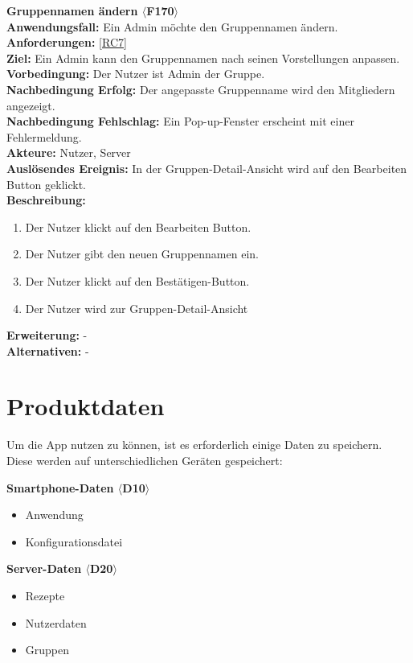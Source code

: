 \documentclass[parskip=full]{scrartcl}
\begin{document}
\textbf{Gruppennamen ändern $\langle$F170$\rangle$}\\
\textbf{Anwendungsfall:} Ein Admin möchte den Gruppennamen ändern.\\
\textbf{Anforderungen:} \ref{RC7}\\
\textbf{Ziel:} Ein Admin kann den Gruppennamen nach seinen Vorstellungen anpassen.\\
\textbf{Vorbedingung:} Der Nutzer ist Admin der Gruppe.\\
\textbf{Nachbedingung Erfolg:} Der angepasste Gruppenname wird den Mitgliedern angezeigt.\\
\textbf{Nachbedingung Fehlschlag:} Ein Pop-up-Fenster erscheint mit einer Fehlermeldung.\\
\textbf{Akteure:} Nutzer, Server \\
\textbf{Auslösendes Ereignis:} In der Gruppen-Detail-Ansicht wird auf den Bearbeiten Button geklickt.\\
\textbf{Beschreibung:}
\begin{enumerate}
    \item Der Nutzer klickt auf den Bearbeiten Button.
    \item Der Nutzer gibt den neuen Gruppennamen ein.
    \item Der Nutzer klickt auf den Bestätigen-Button.
    \item Der Nutzer wird zur Gruppen-Detail-Ansicht
\end{enumerate}
\textbf{Erweiterung:} -\\
\textbf{Alternativen:} -\\
\newpage

\section{Produktdaten}
Um die App nutzen zu können, ist es erforderlich einige Daten zu speichern. Diese werden auf unterschiedlichen Geräten gespeichert:

\textbf{Smartphone-Daten $\langle$D10$\rangle$}
\begin{itemize}
    \item Anwendung
    \item Konfigurationsdatei
\end{itemize}

\textbf{Server-Daten $\langle$D20$\rangle$}
\begin{itemize}
    \item Rezepte
    \item Nutzerdaten
    \item Gruppen
\end{itemize}
\end{document}
